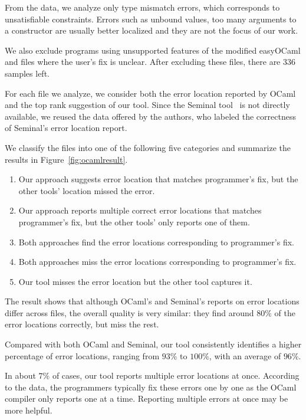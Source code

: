 From the data, we analyze only type mismatch errors, which corresponds
to unsatisfiable constraints. Errors such as unbound values, too many
arguments to a constructor are usually better localized and they are
not the focus of our work. 

We also exclude programs using unsupported features of the modified
easyOCaml and files where the user's fix is unclear. After excluding
these files, there are 336 samples left.

For each file we analyze, we consider both the error location reported
by OCaml and the top rank suggestion of our tool. Since the Seminal
tool~\cite{lerner:pldi07} is not directly available, we reused the data
offered by the authors, who labeled the correctness of Seminal's error
location report.

We classify the files into one of the following five
categories and summarize the results in Figure~\ref{fig:ocamlresult}.

\begin{enumerate}
\item Our approach suggests error location that matches programmer's
fix, but the other tools' location missed the error.

\item Our approach reports multiple correct error locations that
matches programmer's fix, but the other tools' only reports one of
them.

\item Both approaches find the error locations corresponding to
programmer's fix.

\item Both approaches miss the error locations corresponding to
programmer's fix.

\item Our tool misses the error location but the other tool captures
it.
\end{enumerate}

The result shows that although OCaml's and Seminal's reports on error
locations differ across files, the overall quality is very similar:
they find around $80\%$ of the error locations correctly, but miss the
rest. 

Compared with both OCaml and Seminal, our tool consistently identifies
a higher percentage of error locations,
ranging from $93\%$ to $100\%$, with an average of $96\%$.

In about $7\%$ of
cases, our tool reports multiple error locations at once.
According to the data, the programmers typically fix these errors one
by one as the OCaml compiler only reports one at a time.
Reporting multiple errors at once may be more helpful.

